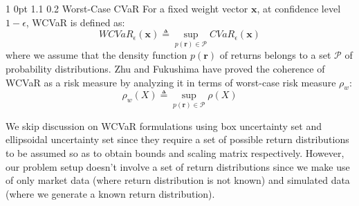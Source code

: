 \documentclass[12pt]{article}
\makeatletter
\numberwithin{equation}{section}
\renewcommand{\subsection}{
  \@startsection
  {subsection}%
  {1}%
  {0pt}%
  {1.1\baselineskip}%
  {0.2\baselineskip}%
  {\sc \centering}%
}
\makeatother
\begin{document}
\subsection {Worst-Case CVaR}
For a fixed weight vector $\mathbf{x}$, at confidence level $1-\epsilon$, WCVaR is defined as:
\begin{equation}
\label{eq:6.2}
WCVaR_{\epsilon}(\mathbf{x}) \triangleq \sup_{p(\mathbf{r}) \in \mathcal{P}}CVaR_{\epsilon}(\mathbf{x})
\end{equation}
where we assume that the density function $p(\mathbf{r})$ of returns belongs to a set $\mathcal{P}$ of probability distributions. Zhu and Fukushima \cite{zhu} have proved the coherence of WCVaR as a risk measure by analyzing it in terms of worst-case risk measure $\rho_{w}$:
\begin{equation}
\label{eq:6.3}
\rho_{w}(X) \triangleq \sup_{p(\mathbf{r}) \in \mathcal{P}} \rho (X)
\end{equation}

We skip discussion on WCVaR formulations using box uncertainty set and ellipsoidal uncertainty set since they require a set of possible return distributions to be assumed so as to obtain bounds and scaling matrix respectively. However, our problem setup doesn't involve a set of return distributions since we make use of only market data (where return distribution is not known) and simulated data (where we generate a known return distribution).
\end{document}
